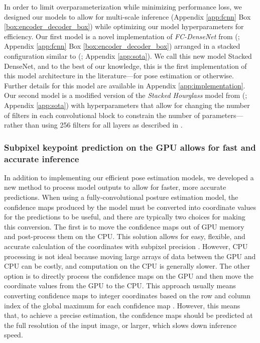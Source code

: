 \documentclass[11pt,a4paper,oneside]{article}
\begin{document}
In order to limit overparameterization while minimizing performance loss, we designed our models to allow for multi-scale inference (Appendix \ref{app:fcnn} Box \ref{box:encoder_decoder_box}) while optimizing our model hyperparameters for efficiency. Our first model is a novel implementation of \textit{FC-DenseNet} from \citeauthor{Jegou16} (\citeyear{Jegou16}; Appendix \ref{app:fcnn} Box \ref{box:encoder_decoder_box}) arranged in a stacked configuration similar to \citeauthor{newell2016} (\citeyear{newell2016}; Appendix \ref{app:sota}). We call this new model Stacked DenseNet, and to the best of our knowledge, this is the first implementation of this model architecture in the literature—for pose estimation or otherwise. Further details for this model are available in Appendix \ref{app:implementation}. Our second model is a modified version of the \textit{Stacked Hourglass} model from \citeauthor{newell2016} (\citeyear{newell2016}; Appendix \ref{app:sota}) with hyperparameters that allow for changing the number of filters in each convolutional block to constrain the number of parameters—rather than using 256 filters for all layers as described in \cite{newell2016}.

\subsubsection[Subpixel keypoint prediction on the GPU]{Subpixel keypoint prediction on the GPU allows for fast and accurate inference}
In addition to implementing our efficient pose estimation models, we developed a new method to process model outputs to allow for faster, more accurate predictions. When using a fully-convolutional posture estimation model, the confidence maps produced by the model must be converted into coordinate values for the predictions to be useful, and there are typically two choices for making this conversion. The first is to move the confidence maps out of GPU memory and post-process them on the CPU. This solution allows for easy, flexible, and accurate calculation of the coordinates with subpixel precision \citep{insafutdinov2016deepercut, mathis2018deeplabcut}. However, CPU processing is not ideal because moving large arrays of data between the GPU and CPU can be costly, and computation on the CPU is generally slower. The other option is to directly process the confidence maps on the GPU and then move the coordinate values from the GPU to the CPU. This approach usually means converting confidence maps to integer coordinates based on the row and column index of the global maximum for each confidence map \citep{pereira2019fast}. However, this means that, to achieve a precise estimation, the confidence maps should be predicted at the full resolution of the input image, or larger, which slows down inference speed.
\end{document}
